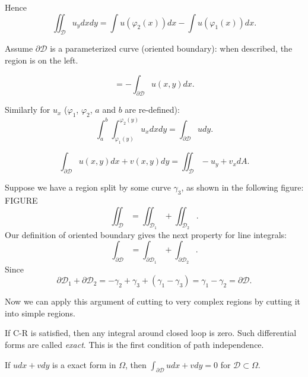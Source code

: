 Hence \[
	\iint_{\mathcal{D}} u_y dx dy = \int  u(\varphi_2(x))dx-\int u(\varphi_1(x)) dx
.\] 

Assume $\partial \mathcal{D}$ is a parameterized curve (oriented boundary): when described, the region is on the left.

\[
	= -\int_{\partial \mathcal{D}} u(x,y) dx
.\] 


Similarly for $u_x$ ($\varphi_1$, $\varphi_2$, $a$ and $b$ are re-defined):
\[
	\int_a^b\int _{\varphi_1(y)}^{\varphi_2(y)} u_x dx dy
	= \int_{\partial \mathcal{D}}u dy
.\] 

\begin{definition}
\[
	\int _{\partial \mathcal{D}} u(x,y)dx + v(x,y)dy
	= \iint_{\mathcal{D}} - u_y + v_x dA
.\] 
\end{definition}

Suppose we have a region split by some curve $\gamma_3$, as shown in the following figure: FIGURE
\[
	\iint_{\mathcal{D}}=
	\iint_{\mathcal{D}_1}+
	\iint_{\mathcal{D}_2}
.\] 
Our definition of oriented boundary gives the next property for line integrals:
\[
	\int _{\partial \mathcal{D}}=
	\int _{\partial \mathcal{D}_1}+
	\int _{\partial \mathcal{D}_2}
.\] 
Since
\[
	\partial \mathcal{D}_1
	+\partial \mathcal{D}_2
	= -\gamma_2 + \gamma_3 + (\gamma_1-\gamma_3) = \gamma_1 - \gamma_2 = \partial \mathcal{D}
.\] 


Now we can apply this argument of cutting to very complex regions by cutting it into simple regions.

If C-R is satisfied, then any integral around closed loop is zero. Such differential forms are called \textit{exact}. This is the first condition of path independence.

If $u dx + v dy $ is a exact form in $\Omega$, then 
$\int _{\partial \mathcal{D}} u dx + v dy = 0$ for $\mathcal{D} \subset \Omega$.
